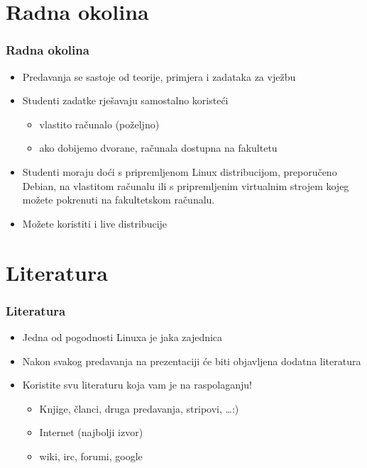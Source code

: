 \documentclass{beamer}
\begin{document}
\section{Radna okolina}
\begin{frame}[t]
\frametitle{Radna okolina}
\begin{itemize}
	\item Predavanja se sastoje od teorije, primjera i zadataka za vježbu
	\item Studenti zadatke rješavaju samostalno koristeći
	\begin{itemize}
		\item vlastito računalo (poželjno)
		\item ako dobijemo dvorane, računala dostupna na fakultetu
	\end{itemize}
	\item Studenti moraju doći s pripremljenom Linux distribucijom, preporučeno Debian, na vlastitom računalu ili s pripremljenim virtualnim strojem kojeg možete pokrenuti na fakultetskom računalu.
	\item Možete koristiti i live distribucije
\end{itemize}
\end{frame}

\section{Literatura}
\begin{frame}[t]
\frametitle{Literatura}
\begin{itemize}
	\item Jedna od pogodnosti Linuxa je jaka zajednica
	\item Nakon svakog predavanja na prezentaciji će biti objavljena dodatna literatura
	\item Koristite svu literaturu koja vam je na raspolaganju!
	\begin{itemize}
		\item Knjige, članci, druga predavanja, stripovi, \ldots :)
		\item Internet (najbolji izvor)
		\item wiki, irc, forumi, google
	\end{itemize}
\end{itemize}
\end{frame}
\end{document}
